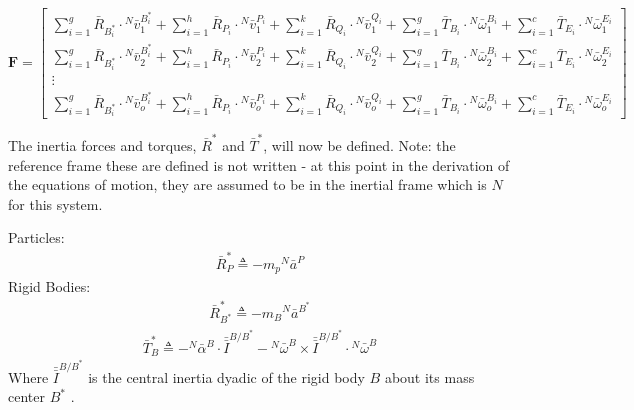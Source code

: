\documentclass[smallcondensed,final]{svjour3}                     %
\begin{document}
\begin{equation}
\label{eq:definition_F}
\mathbf{F} =
\begin{bmatrix}
\displaystyle \sum_{i=1}^g \bar{R}_{B^*_i} \cdot {^N}\bar{v}^{B^*_i}_1 +
\sum_{i=1}^h \bar{R}_{P_i} \cdot {^N}\bar{v}^{P_i}_1 +
\sum_{i=1}^k \bar{R}_{Q_i} \cdot {^N}\bar{v}^{Q_i}_1 +
\sum_{i=1}^g \bar{T}_{B_i} \cdot {^N}\bar{\omega}^{B_i}_1 +
\sum_{i=1}^c \bar{T}_{E_i} \cdot {^N}\bar{\omega}^{E_i}_1 \\
\displaystyle \sum_{i=1}^g \bar{R}_{B^*_i} \cdot {^N}\bar{v}^{B^*_i}_2 +
\sum_{i=1}^h \bar{R}_{P_i} \cdot {^N}\bar{v}^{P_i}_2 +
\sum_{i=1}^k \bar{R}_{Q_i} \cdot {^N}\bar{v}^{Q_i}_2 +
\sum_{i=1}^g \bar{T}_{B_i} \cdot {^N}\bar{\omega}^{B_i}_2 +
\sum_{i=1}^c \bar{T}_{E_i} \cdot {^N}\bar{\omega}^{E_i}_2 \\
\displaystyle \vdots \\
\displaystyle \sum_{i=1}^g \bar{R}_{B^*_i} \cdot {^N}\bar{v}^{B^*_i}_o +
\sum_{i=1}^h \bar{R}_{P_i} \cdot {^N}\bar{v}^{P_i}_o +
\sum_{i=1}^k \bar{R}_{Q_i} \cdot {^N}\bar{v}^{Q_i}_o +
\sum_{i=1}^g \bar{T}_{B_i} \cdot {^N}\bar{\omega}^{B_i}_o +
\sum_{i=1}^c \bar{T}_{E_i} \cdot {^N}\bar{\omega}^{E_i}_o
\end{bmatrix}
\end{equation}

The inertia forces and torques, $\bar{R}^*$ and $\bar{T}^*$, will now be
defined. Note: the reference frame these are defined is not written - at this
point in the derivation of the equations of motion, they are assumed to be in
the inertial frame which is $N$ for this system.

Particles:
\begin{align}
\label{eq:particle_gen_inertia}
\bar{R}^*_P \triangleq -m_p {^N}\bar{a}^P
\end{align}
Rigid Bodies:
\begin{align}
\label{eq:rb_translational_gen_inertia}
\bar{R}^*_{B^*} \triangleq -m_B {^N}\bar{a}^{B^*}
\end{align}
\begin{align}
\label{eq:rb_rotational_gen_inertia}
\bar{T}^*_B \triangleq -{^N}\bar{\alpha}^B \cdot \bar{\bar{I}}^{B/B^*} -
{^N}\bar{\omega}^B \times \bar{\bar{I}}^{B/B^*} \cdot {^N}\bar{\omega}^B
\end{align}
Where $\bar{\bar{I}}^{B/B^*}$ is the central inertia dyadic of the rigid body
$B$ about its mass center $B^*$ \cite{Kane1985}.
\end{document}

